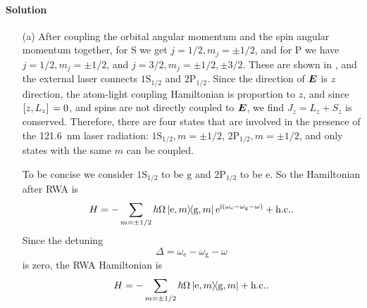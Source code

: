 \documentclass[hyperref, a4paper]{article}
\newcommand*{\ii}{\mathrm{i}}
\newcommand*{\ee}{\mathrm{e}}
\begin{document}
\paragraph{Solution} \begin{itemize}
\item[(a)] After coupling the orbital angular momentum and the spin angular momentum together, for $\text{S}$
we get $j=1/2, m_j = \pm 1/2$, and for $\text{P}$ we have $j = 1/2, m_j = \pm 1/2$, and 
$j = 3/2, m_j = \pm 1/2, \pm 3/2$. These are shown in , and the external laser connects
$1 \text{S}_{1/2}$ and $2 \text{P}_{1/2}$. Since the direction of $\vb*{E}$ is $z$ direction, the atom-light 
coupling Hamiltonian is proportion to $z$, and since $\comm*{z}{L_z} = 0$, and spins are not directly coupled 
to $\vb*{E}$, we find $J_z = L_z + S_z$ is conserved. Therefore, there are four 
states that are involved in the presence of the \SI{121.6}{nm} laser radiation: $1 \text{S}_{1/2}, m = \pm 1/2$, 
$2 \text{P}_{1/2}, m = \pm 1/2$, and only states with the same $m$ can be coupled. 

To be concise we consider $1 \text{S}_{1/2}$ to be $\text{g}$ and $2 \text{P}_{1/2}$ to be $\text{e}$.
So the Hamiltonian after RWA is 
\begin{equation}
    H = - \sum_{m = \pm 1/2} \hbar \Omega \dyad*{\text{e}, m}{\text{g}, m} \ee^{\ii (\omega_\text{e} - \omega_\text{g} - \omega)} + \text{h.c.}.
\end{equation}
Since the detuning 
\begin{equation}
    \Delta = \omega_\text{e} - \omega_\text{g} - \omega
\end{equation}
is zero, the RWA Hamiltonian is 
\begin{equation}
    H = - \sum_{m = \pm 1/2} \hbar \Omega \dyad*{\text{e}, m}{\text{g}, m} + \text{h.c.}.
\end{equation}


\end{itemize}
\end{document}
